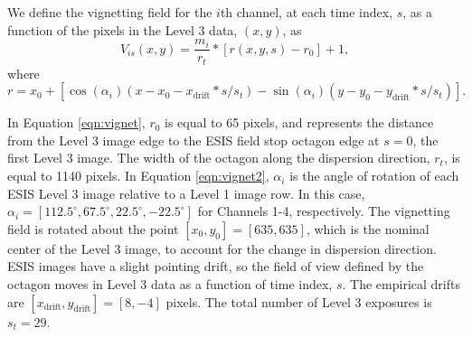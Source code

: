 We define the vignetting field for the $i$th channel, at each time index, $s$, as a function of the pixels in the Level 3 data, $(x,y)$, as 
	\begin{equation}
		V_{is}(x,y) = \frac{m_i}{r_t} * [r(x,y,s) - r_0] + 1,
		\label{eqn:vignet}
	\end{equation}
where
	\begin{equation}
		r = x_0 + [\cos(\alpha_i)(x-x_0-x_{\text{drift}}*s/s_t) - \sin(\alpha_i)(y-y_0-y_{\text{drift}}*s/s_t)].
		\label{eqn:vignet2}
	\end{equation}

 In Equation \ref{eqn:vignet}, $r_0$ is equal to 65 pixels, and represents the distance from the Level 3 image edge to the ESIS field stop octagon edge at $s = 0$, the first Level 3 image.
The width of the octagon along the dispersion direction, $r_t$, is equal to 1140 pixels.
In Equation \ref{eqn:vignet2},  $\alpha_i$ is the angle of rotation of each ESIS Level 3 image relative to a Level 1 image row.
In this case, $\alpha_i = [112.5^{\circ}, 67.5^{\circ}, 22.5^{\circ}, -22.5^{\circ}]$ for Channels 1-4, respectively.
The vignetting field is rotated about the point $[x_0, y_0] = [635,635]$, which is the nominal center of the Level 3 image, to account for the change in dispersion direction.
ESIS images have a slight pointing drift, so the field of view defined by the octagon moves in Level 3 data as a function of time index, $s$. 
The empirical drifts are $[x_{\text{drift}},y_{\text{drift}}] = [8, -4]$ pixels. 
The total number of Level 3 exposures is $s_t=29$. 

